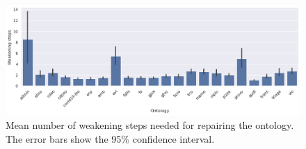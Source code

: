 \begin{figure}[ht]
  \begin{widepage}
    \centering
    \includegraphics[width=\textwidth]{resources/steps-ontology-bar.png}
  \end{widepage}
  \caption{Mean number of weakening steps needed for repairing the ontology. The error bars show the 95\% confidence interval.}
\end{figure}


